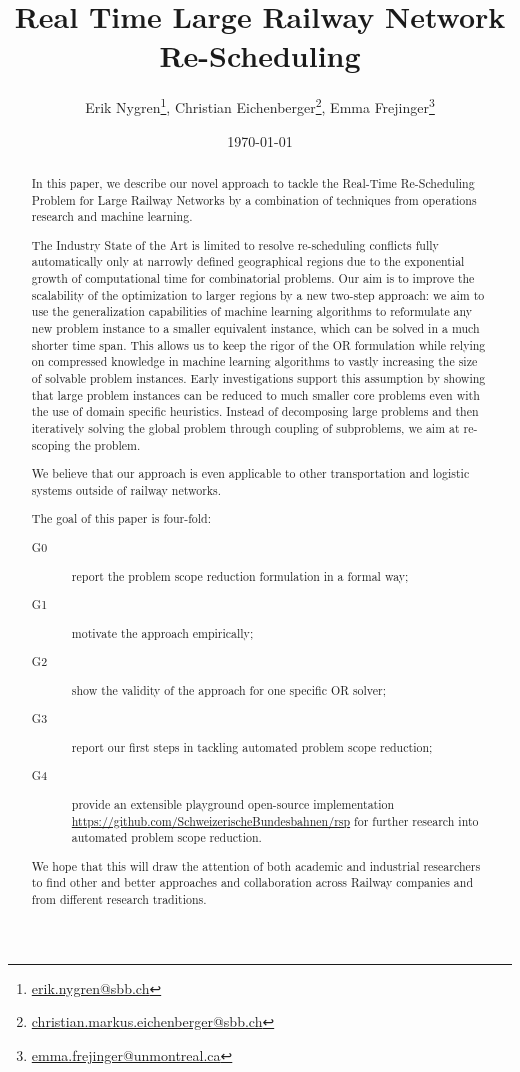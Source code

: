 \documentclass{article}
\title{Real Time Large Railway Network Re-Scheduling}
\author{Erik Nygren\footnote{\url{erik.nygren@sbb.ch}}, Christian Eichenberger\footnote{\url{christian.markus.eichenberger@sbb.ch}}, Emma Frejinger\footnote{\url{emma.frejinger@unmontreal.ca}}}
\date{\today}
\begin{document}
\maketitle

\tableofcontents 
\newpage
\begin{abstract} 
In this paper, we describe our novel approach to tackle the Real-Time Re-Scheduling Problem for Large Railway Networks by a combination of techniques from operations research and machine learning. 

The Industry State of the Art is limited to resolve re-scheduling conflicts fully automatically only at narrowly defined geographical regions due to the exponential growth of computational time for combinatorial problems. Our aim is to improve the scalability of the optimization to larger regions by a new two-step approach: we aim to use the generalization capabilities of machine learning algorithms to reformulate any new problem instance to a smaller equivalent instance, which can be solved in a much shorter time span. 
This allows us to keep the rigor of the OR formulation while relying on compressed knowledge in machine learning algorithms to vastly increasing the size of solvable problem instances.
Early investigations support this assumption by showing that large problem instances can be reduced to much smaller core problems even with the use of domain specific heuristics.
Instead of decomposing large problems and then iteratively solving the global problem through coupling of subproblems, we aim at re-scoping the problem.

We believe that our approach is even applicable to other transportation and logistic systems outside of railway networks.

The goal of this paper is four-fold: 
\begin{description}
\item[G0] report the problem scope reduction formulation in a formal way;
\item[G1] motivate the approach empirically;
\item[G2] show the validity of the approach for one specific OR solver;
\item[G3] report our first steps in tackling automated problem scope reduction;
\item[G4] provide an extensible playground open-source implementation \url{https://github.com/SchweizerischeBundesbahnen/rsp} for further research into automated problem scope reduction.
\end{description}
 We hope that this will draw the attention of both academic and industrial researchers to find other and better approaches and collaboration across Railway companies and from different research traditions. 
\end{abstract} 
\end{document}
